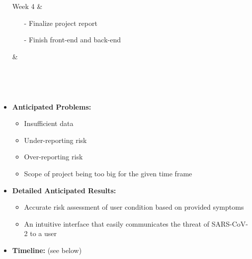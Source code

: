 \documentclass{article}
\begin{document}
\begin{itemize}
\begin{table}[]
\begin{tabularx}{\linewidth}
        \hline
        Week 4 
        & 
        \begin{itemize}[leftmargin=*] 
            \item[-] Finalize project report
            \item[-] Finish front-end and back-end
        \end{itemize}
        &
        \begin{itemize}[leftmargin=*] 
        \end{itemize}
        \\
        
        \hline
        \end{tabularx} \\
    \end{table}
    \item \textbf{Anticipated Problems:} 
    \begin{itemize}
        \item Insufficient data
        \item Under-reporting risk
        \item Over-reporting risk
        \item Scope of project being too big for the given time frame
    \end{itemize}
    \item \textbf{Detailed Anticipated Results:}  
    \begin{itemize}
        \item Accurate risk assessment of user condition based on provided symptoms 
        \item An intuitive interface that easily communicates the threat of SARS-CoV-2 to a user
    \end{itemize}

    \item \textbf{Timeline:} (see below)  \\ \\
    
    
\end{itemize}




\nocite{*}
\end{document}
